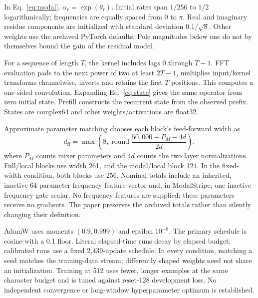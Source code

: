 \documentclass[11pt,letterpaper]{article}
\begin{document}
In Eq.~\eqref{eq:modal}, $\alpha_r=\exp(\theta_r)$. Initial rates span $1/256$ to $1/2$ logarithmically; frequencies are equally spaced from 0 to $\pi$. Real and imaginary residue components are initialized with standard deviation $0.1/\sqrt8$. Other weights use the archived PyTorch defaults. Pole magnitudes below one do not by themselves bound the gain of the residual model.

For a sequence of length $T$, the kernel includes lags 0 through $T-1$. FFT evaluation pads to the next power of two at least $2T-1$, multiplies input/kernel transforms channelwise, inverts and retains the first $T$ positions. This computes a one-sided convolution. Expanding Eq.~\eqref{eq:state} gives the same operator from zero initial state. Prefill constructs the recurrent state from the observed prefix. States are complex64 and other weights/activations are float32.

Approximate parameter matching chooses each block's feed-forward width as
\[
 d_{\mathrm{ff}}=\max\left(8,\operatorname{round}\frac{50{,}000-P_M-4d}{2d}\right),
\]
where $P_M$ counts mixer parameters and $4d$ counts the two layer normalizations. Full/local blocks use width 261, and the modal/local block 124. In the fixed-width condition, both blocks use 256. Nominal totals include an inherited, inactive 64-parameter frequency-feature vector and, in ModalStripe, one inactive frequency-gate scalar. No frequency features are supplied; these parameters receive no gradients. The paper preserves the archived totals rather than silently changing their definition.

AdamW uses moments $(0.9,0.999)$ and epsilon $10^{-8}$. The primary schedule is cosine with a 0.1 floor. Literal elapsed-time runs decay by elapsed budget; calibrated runs use a fixed 2,439-update schedule. In every condition, matching a seed matches the training-data stream; differently shaped weights need not share an initialization. Training at 512 uses fewer, longer examples at the same character budget and is tuned against reset-128 development loss. No independent convergence or long-window hyperparameter optimum is established.
\end{document}
